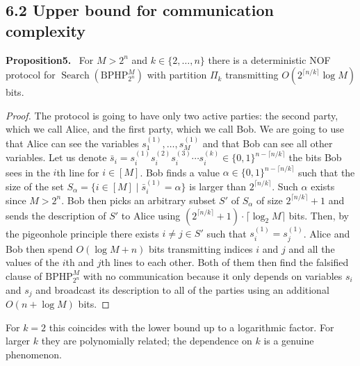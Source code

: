 \documentclass[10pt,a4paper]{article}
\newenvironment{authorclaim}[1]{\par\medskip\noindent\textbf{#1.}\ \ignorespaces}{\par\medskip}
\begin{document}
\subsection*{6.2 Upper bound for communication complexity}
\begin{authorclaim}{Proposition5}
For $M>2^n$ and $k\in\{2,\ldots,n\}$ there is a deterministic NOF protocol for $\operatorname{Search}(\mathrm{BPHP}_{2^n}^M)$ with partition $\Pi_k$ transmitting $O(2^{\lceil n/k\rceil}\log M)$ bits.
\end{authorclaim}
\begin{proof}
The protocol is going to have only two active parties: the second party, which we call Alice, and the first party, which we call Bob. We are going to use that Alice can see the variables $s_1^{(1)},\ldots,s_M^{(1)}$ and that Bob can see all other variables.
Let us denote $\bar s_i=s_i^{(1)}s_i^{(2)}s_i^{(3)}\cdots s_i^{(k)}\in\{0,1\}^{n-\lceil n/k\rceil}$ the bits Bob sees in the $i$th line for $i\in[M]$. Bob finds a value $\alpha\in\{0,1\}^{n-\lceil n/k\rceil}$ such that the size of the set $S_\alpha=\{i\in[M]\mid\bar s_i^{(1)}=\alpha\}$ is larger than $2^{\lceil n/k\rceil}$. Such $\alpha$ exists since $M>2^n$. Bob then picks an arbitrary subset $S'$ of $S_\alpha$ of size $2^{\lceil n/k\rceil}+1$ and sends the description of $S'$ to Alice using $(2^{\lceil n/k\rceil}+1)\cdot\lceil\log_2M\rceil$ bits. Then, by the pigeonhole principle there exists $i\ne j\in S'$ such that $s_i^{(1)}=s_j^{(1)}$. Alice and Bob then spend $O(\log M+n)$ bits transmitting indices $i$ and $j$ and all the values of the $i$th and $j$th lines to each other. Both of them then find the falsified clause of $\mathrm{BPHP}_{2^n}^M$ with no communication because it only depends on variables $s_i$ and $s_j$ and broadcast its description to all of the parties using an additional $O(n+\log M)$ bits.
\end{proof}
For $k=2$ this coincides with the lower bound up to a logarithmic factor. For larger $k$ they are polynomially related; the dependence on $k$ is a genuine phenomenon.
\end{document}
